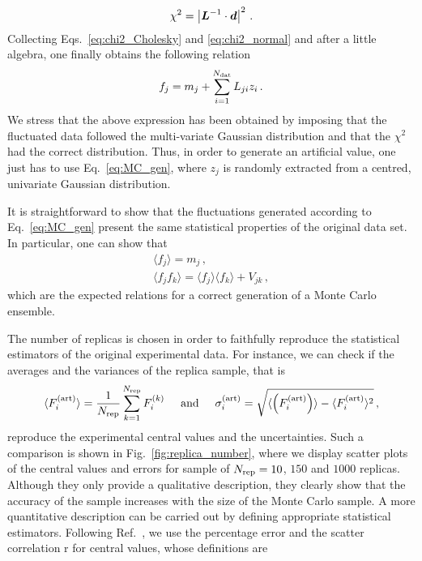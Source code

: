 \begin{equation}
  \chi^2 = \left| \vb*{L}^{-1} \cdot \vb*{d} \right|^2 \,.
  \label{eq:chi2_Cholesky}
\end{equation}
Collecting Eqs.~\eqref{eq:chi2_Cholesky} and \eqref{eq:chi2_normal} and after a little algebra, one finally obtains the following relation
\begin{equation}
  f_j = m_j + \sum_{i=1}^{N_{\textrm{dat}}} L_{ji} z_i\,.
  \label{eq:MC_gen}
\end{equation}
We stress that the above expression has been obtained by imposing that the fluctuated data followed the multi-variate Gaussian distribution and that the $\chi^2$ had the correct distribution. Thus, in order to generate an artificial value, one just has to use Eq.~\eqref{eq:MC_gen}, where $z_j$ is randomly extracted from a centred, univariate Gaussian distribution.\par
It is straightforward to show that the fluctuations generated according to Eq.~\eqref{eq:MC_gen} present the same statistical properties of the original data set. In particular, one can show that
\begin{gather}
  \langle f_j \rangle = m_j \,,\\
  \langle f_j f_k \rangle = \langle f_j \rangle \langle f_k \rangle + V_{jk} \,,
\end{gather}
which are the expected relations for a correct generation of a Monte Carlo ensemble.\par
The number of replicas is chosen in order to faithfully reproduce the statistical estimators of the original experimental data. For instance, we can check if the averages and the variances of the replica sample, that is
\begin{equation}
  \langle F_{i}^{\textrm{(art)}} \rangle = \frac{1}{N_{\textrm{rep}}} \sum_{k=1}^{N_{\textrm{rep}}} F_{i}^{(k)} \hspace{5mm} \textrm{and} \hspace*{5mm} \sigma_i^{\textrm{(art)}} = \sqrt{ \langle \left( F_{i}^{\textrm{(art)}} \right) \rangle - \langle F_{i}^{\textrm{(art)}} \rangle^2} \,,
\end{equation}
reproduce the experimental central values and the uncertainties. Such a comparison is shown in Fig.~\ref{fig:replica_number}, where we display scatter plots of the central values and errors for sample of $N_{\textrm{rep}} = 10$, $150$ and $1000$ replicas. Although they only provide a qualitative description, they clearly show that the accuracy of the sample increases with the size of the Monte Carlo sample. A more quantitative description can be carried out by defining appropriate statistical estimators. Following Ref.~\cite{DelDebbio:2004xtd}, we use the percentage error and the scatter correlation r for central values, whose definitions are
